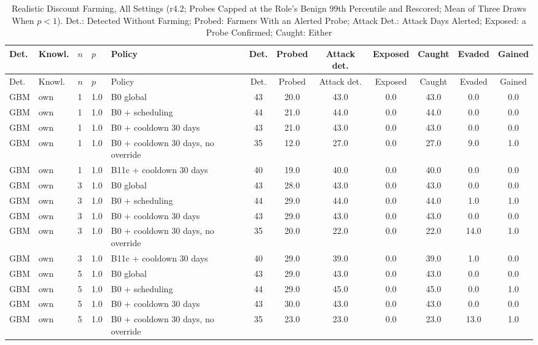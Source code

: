 \begin{longtable}{lllllccccccc}
\caption{Realistic Discount Farming, All Settings (r4.2; Probes Capped at the Role's Benign 99th Percentile and Rescored; Mean of Three Draws When $p<1$). Det.: Detected Without Farming; Probed: Farmers With an Alerted Probe; Attack Det.: Attack Days Alerted; Exposed: a Probe Confirmed; Caught: Either\label{tab:e-l3-r42}}\\
\toprule
Det. & Knowl. & $n$ & $p$ & Policy & Det. & Probed & Attack det. & Exposed & Caught & Evaded & Gained \\
\midrule
\endfirsthead
\toprule
Det. & Knowl. & $n$ & $p$ & Policy & Det. & Probed & Attack det. & Exposed & Caught & Evaded & Gained \\
\midrule
\endhead
GBM & own & 1 & 1.0 & B0 global & 43 & 20.0 & 43.0 & 0.0 & 43.0 & 0.0 & 0.0 \\
GBM & own & 1 & 1.0 & B0 + scheduling & 44 & 21.0 & 44.0 & 0.0 & 44.0 & 0.0 & 0.0 \\
GBM & own & 1 & 1.0 & B0 + cooldown 30 days & 43 & 21.0 & 43.0 & 0.0 & 43.0 & 0.0 & 0.0 \\
GBM & own & 1 & 1.0 & B0 + cooldown 30 days, no override & 35 & 12.0 & 27.0 & 0.0 & 27.0 & 9.0 & 1.0 \\
GBM & own & 1 & 1.0 & B11c + cooldown 30 days & 40 & 19.0 & 40.0 & 0.0 & 40.0 & 0.0 & 0.0 \\
GBM & own & 3 & 1.0 & B0 global & 43 & 28.0 & 43.0 & 0.0 & 43.0 & 0.0 & 0.0 \\
GBM & own & 3 & 1.0 & B0 + scheduling & 44 & 29.0 & 44.0 & 0.0 & 44.0 & 1.0 & 1.0 \\
GBM & own & 3 & 1.0 & B0 + cooldown 30 days & 43 & 29.0 & 43.0 & 0.0 & 43.0 & 0.0 & 0.0 \\
GBM & own & 3 & 1.0 & B0 + cooldown 30 days, no override & 35 & 20.0 & 22.0 & 0.0 & 22.0 & 14.0 & 1.0 \\
GBM & own & 3 & 1.0 & B11c + cooldown 30 days & 40 & 29.0 & 39.0 & 0.0 & 39.0 & 1.0 & 0.0 \\
GBM & own & 5 & 1.0 & B0 global & 43 & 29.0 & 43.0 & 0.0 & 43.0 & 0.0 & 0.0 \\
GBM & own & 5 & 1.0 & B0 + scheduling & 44 & 29.0 & 45.0 & 0.0 & 45.0 & 0.0 & 1.0 \\
GBM & own & 5 & 1.0 & B0 + cooldown 30 days & 43 & 30.0 & 43.0 & 0.0 & 43.0 & 0.0 & 0.0 \\
GBM & own & 5 & 1.0 & B0 + cooldown 30 days, no override & 35 & 23.0 & 23.0 & 0.0 & 23.0 & 13.0 & 1.0 \\

\end{longtable}
